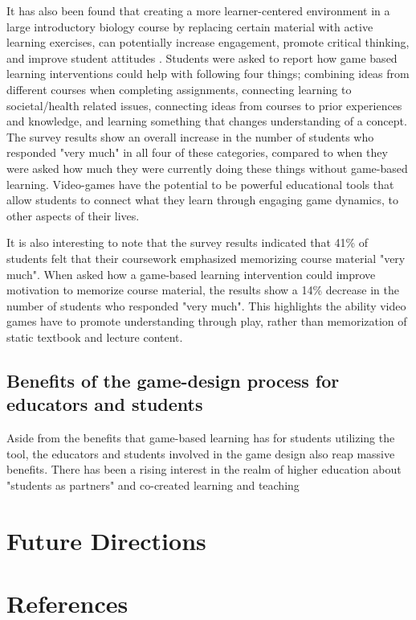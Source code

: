 \documentclass[10pt]{article}
\begin{document}
It has also been found that creating a more learner-centered environment in a large introductory biology course by replacing certain material with active learning exercises, can potentially increase engagement, promote critical thinking, and improve student attitudes \citep{moravec2010learn, o2009garage}. Students were asked to report how game based learning interventions could help with following four things; combining ideas from different courses when completing assignments, connecting learning to societal/health related issues, connecting ideas from courses to prior experiences and knowledge, and learning something that changes understanding of a concept. The survey results show an overall increase in the number of students who responded "very much" in all four of these categories, compared to when they were asked how much they were currently doing these things without game-based learning. Video-games have the potential to be powerful educational tools that allow students to connect what they learn through engaging game dynamics, to other aspects of their lives.

It is also interesting to note that the survey results indicated that 41\% of students felt that their coursework emphasized memorizing course material "very much". When asked how a game-based learning intervention could improve motivation to memorize course material, the results show a 14\% decrease in the number of students who responded "very much". This highlights the ability video games have to promote understanding through play, rather than memorization of static textbook and lecture content.

\subsection{Benefits of the game-design process for educators and students}

Aside from the benefits that game-based learning has for students utilizing the tool, the educators and students involved in the game design also reap massive benefits. There has been a rising interest in the realm of higher education about "students as partners" and co-created learning and teaching \citep{bibid}

\section{Future Directions}

\clearpage\newpage
\section{References}


\nocite{*}
\printbibliography[heading=none, sorting=nyt]
\newpage
\end{document}
